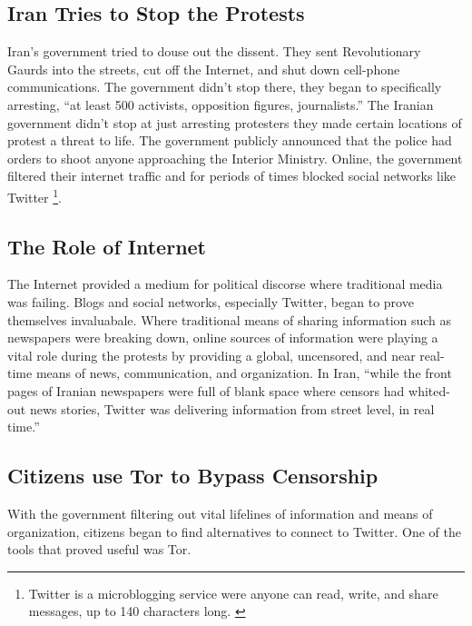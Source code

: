 \documentclass[11pt]{article}
\begin{document}
\begin{multicols}{2}
\subsection{Iran Tries to Stop the Protests}

Iran's government tried to douse out the dissent. They sent
Revolutionary Gaurds into the streets, cut off the Internet, and shut down
cell-phone communications. \cite{TheIranianVote} The government didn't stop
there, they began to specifically arresting, ``at least 500 activists,
opposition figures, journalists.'' \cite{IranProtestsFifthDayOfUnrest} The
Iranian government didn't stop at just arresting protesters they made certain
locations of protest a threat to life. The government publicly announced that
the police had orders to shoot anyone approaching the Interior Ministry.
\cite{TheIranianVote} Online, the government filtered their internet traffic and
for periods of times blocked social networks like Twitter \footnote{Twitter is a
microblogging service were anyone can read, write, and share messages, up to 140
characters long.  \cite{WhatIsTwitter}}.  \cite{IranBlocksFacebookTwitter}

\subsection{The Role of Internet}

The Internet provided a medium for political discorse where traditional media
was failing. Blogs and social networks, especially Twitter, began to prove
themselves invaluabale.  Where traditional means of sharing information such as
newspapers were breaking down, online sources of information were playing a
vital role during the protests by providing a global, uncensored, and near
real-time means of news, communication, and organization.  In Iran, ``while the
front pages of Iranian newspapers were full of blank space where censors had
whited-out news stories, Twitter was delivering information from street level,
in real time.'' \cite{WhyTwitterIsTheMedium}

\subsection{Citizens use Tor to Bypass Censorship}

With the government filtering out vital lifelines of information and means of
organization, citizens began to find alternatives to connect to Twitter.
\cite{FindingWayAroundIranianCensorship} One of the tools that proved useful was
Tor.


\end{multicols}
\end{document}
